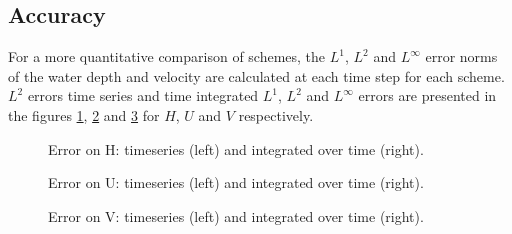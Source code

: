 \subsection{Accuracy}

For a more quantitative comparison of schemes, the $L^1$, $L^2$ and $L^\infty$ error norms
of the water depth and velocity are calculated at each time step for each scheme.
$L^2$ errors time series and time integrated $L^1$, $L^2$ and $L^\infty$ errors are presented in the figures \ref{fig:ritter:ErrNumH}, \ref{fig:ritter:ErrNumU} and \ref{fig:ritter:ErrNumV} for $H$, $U$ and $V$ respectively.

\begin{figure}[H]
\begin{minipage}[t]{0.45\textwidth}
 \centering
\end{minipage}%
\begin{minipage}[t]{0.55\textwidth}
 \centering
\end{minipage}
  \caption{Error on H: timeseries (left) and integrated over time (right).}
  \label{fig:ritter:ErrNumH}
\end{figure}

\begin{figure}[H]
\begin{minipage}[t]{0.45\textwidth}
 \centering
\end{minipage}%
\begin{minipage}[t]{0.55\textwidth}
 \centering
\end{minipage}
  \caption{Error on U: timeseries (left) and integrated over time (right).}
  \label{fig:ritter:ErrNumU}
\end{figure}

\begin{figure}[H]
\begin{minipage}[t]{0.45\textwidth}
 \centering
\end{minipage}%
\begin{minipage}[t]{0.55\textwidth}
 \centering
\end{minipage}
  \caption{Error on V: timeseries (left) and integrated over time (right).}
  \label{fig:ritter:ErrNumV}
\end{figure}

